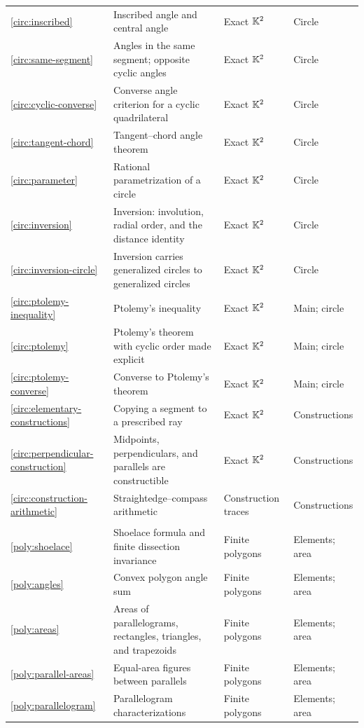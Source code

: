 {\begin{longtable}{@{}>{\raggedright\arraybackslash}p{}>{\raggedright\arraybackslash}p{}>{\raggedright\arraybackslash}p{}>{\raggedright\arraybackslash}p{}@{}}
\ref{circ:inscribed} & Inscribed angle and central angle & Exact $\mathbb K^2$ & Circle\\
\ref{circ:same-segment} & Angles in the same segment; opposite cyclic angles & Exact $\mathbb K^2$ & Circle\\
\ref{circ:cyclic-converse} & Converse angle criterion for a cyclic quadrilateral & Exact $\mathbb K^2$ & Circle\\
\ref{circ:tangent-chord} & Tangent--chord angle theorem & Exact $\mathbb K^2$ & Circle\\
\ref{circ:parameter} & Rational parametrization of a circle & Exact $\mathbb K^2$ & Circle\\
\ref{circ:inversion} & Inversion: involution, radial order, and the distance identity & Exact $\mathbb K^2$ & Circle\\
\ref{circ:inversion-circle} & Inversion carries generalized circles to generalized circles & Exact $\mathbb K^2$ & Circle\\
\ref{circ:ptolemy-inequality} & Ptolemy's inequality & Exact $\mathbb K^2$ & Main; circle\\
\ref{circ:ptolemy} & Ptolemy's theorem with cyclic order made explicit & Exact $\mathbb K^2$ & Main; circle\\
\ref{circ:ptolemy-converse} & Converse to Ptolemy's theorem & Exact $\mathbb K^2$ & Main; circle\\
\ref{circ:elementary-constructions} & Copying a segment to a prescribed ray & Exact $\mathbb K^2$ & Constructions\\
\ref{circ:perpendicular-construction} & Midpoints, perpendiculars, and parallels are constructible & Exact $\mathbb K^2$ & Constructions\\
\ref{circ:construction-arithmetic} & Straightedge--compass arithmetic & Construction traces & Constructions\\
\multicolumn{4}{@{}l}{\textbf{Polygonal area and quadrilaterals} (11 declarations)}\\*[2pt]
\ref{poly:shoelace} & Shoelace formula and finite dissection invariance & Finite polygons & Elements; area\\
\ref{poly:angles} & Convex polygon angle sum & Finite polygons & Elements; area\\
\ref{poly:areas} & Areas of parallelograms, rectangles, triangles, and trapezoids & Finite polygons & Elements; area\\
\ref{poly:parallel-areas} & Equal-area figures between parallels & Finite polygons & Elements; area\\
\ref{poly:parallelogram} & Parallelogram characterizations & Finite polygons & Elements; area\\

\end{longtable}}
